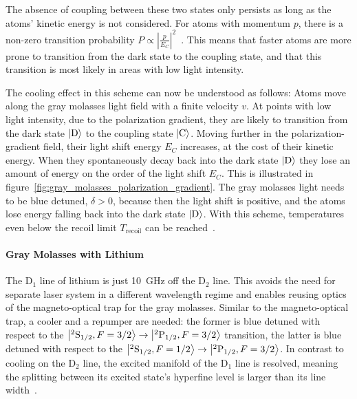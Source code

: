 The absence of coupling between these two states only persists as long as the atoms' kinetic energy is not considered. For atoms with momentum $p$, there is a non-zero transition probability $P \propto \left|\frac{p}{E_C} \right|^2$~\cite{weidemuller_novel_1994}. This means that faster atoms are more prone to transition from the dark state to the coupling state, and that this transition is most likely in areas with low light intensity.

The cooling effect in this scheme can now be understood as follows: Atoms move along the gray molasses light field with a finite velocity $v$. At points with low light intensity, due to the polarization gradient, they are likely to transition from the dark state $\Ket{\text{D}}$ to the coupling state $\Ket{\text{C}}$. Moving further in the polarization-gradient field, their light shift energy $E_C$ increases, at the cost of their kinetic energy. When they spontaneously decay back into the dark state $\Ket{\text{D}}$ they lose an amount of energy on the order of the light shift $E_C$. This is illustrated in figure~\ref{fig:gray_molasses_polarization_gradient}. The gray molasses light needs to be blue detuned, $\delta > 0$, because then the light shift is positive, and the atoms lose energy falling back into the dark state $\Ket{\text{D}}$. With this scheme,  temperatures even below the recoil limit $T_\text{recoil}$ can be reached~\cite{weidemuller_novel_1994,gerken_gray_2016}.


\paragraph{Gray Molasses with Lithium} The D$_1$ line of lithium is just \SI{10}{\giga\hertz} off the D$_2$ line. This avoids the need for separate laser system in a different wavelength regime and  enables reusing optics of the magneto-optical trap for the gray molasses. Similar to the magneto-optical trap, a cooler and a repumper are needed: the former is blue detuned with respect to the $\Ket{^2\text{S}_{1/2}, F = 3/2} \rightarrow \Ket{^2\text{P}_{1/2}, F = 3/2}$ transition, the latter is blue detuned with respect to the $\Ket{^2\text{S}_{1/2}, F = 1/2} \rightarrow \Ket{^2\text{P}_{1/2}, F = 3/2}$. In contrast to cooling on the D$_2$ line, the excited manifold of the D$_1$ line is resolved, meaning the splitting between its excited state's hyperfine level is larger than its line width~\cite{gerken_gray_2016}.

